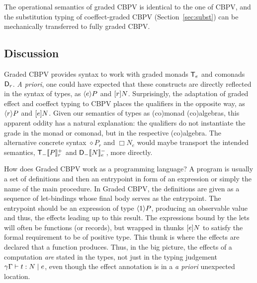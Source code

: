 \documentclass[acmsmall,review,anonymous]{acmart}\settopmatter{printfolios=true,printccs=false,printacmref=false}
\theoremstyle{remark}
\begin{document}

The operational semantics of graded CBPV is identical to the one of
CBPV, and the substitution typing of coeffect-graded CBPV
(Section~\ref{sec:subst}) can be mechanically transferred to fully
graded CBPV.

\subsection{Discussion}

Graded CBPV provides syntax to work with graded monads $\T[e]$ and
comonads $\D[r]$.  \emph{A priori}, one could have expected that these
constructs are directly reflected in the syntax of types, as
$\compty e P$ and $\thunkty r N$.  Surprisingly, the adaptation of
graded effect and coeffect typing to CBPV places the qualifiers in the
opposite way, as $\compty r P$ and $\thunkty e N$.  Given our
semantics of types as (co)monad (co)algebras, this apparent oddity has
a natural explanation: the qualifiers do not instantiate the grade in
the monad or comonad, but in the respective (co)algebra.  The
alternative concrete syntax $\diamond P_r$ and $\Box N_e$ would maybe
transport the intended semantics, $\T[-]{\Denp P r}$ and
$\D[-]{\Denn N e}$, more directly.

How does Graded CBPV work as a programming language?  A program is
usually a set of definitions and then an entrypoint in form of an
expression or simply the name of the main procedure.  In Graded CBPV,
the definitions are given as a sequence of let-bindings whose final
body serves as the entrypoint.  The entrypoint should be an expression
of type $\compty 1 P$, producing an observable value and thus, the
effects leading up to this result.  The expressions bound by the lets
will often be functions (or records), but wrapped in thunks
$\thunkty e N$ to satisfy the formal requirement to be of positive
type.  This thunk is where the effects are declared that a function
produces.  Thus, in the big picture, the effects of a computation
\emph{are} stated in the types, not just in the typing judgement
$\qeCompTy \gamma \Gamma t e N$, even though the effect annotation is
in a \emph{a priori} unexpected location.
\end{document}
